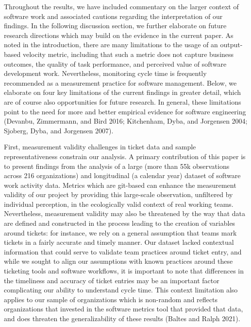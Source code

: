 \documentclass[
]{article}
\begin{document}
Throughout the results, we have included commentary on the larger
context of software work and associated cautions regarding the
interpretation of our findings. In the following discussion section, we
further elaborate on future research directions which may build on the
evidence in the current paper. As noted in the introduction, there are
many limitations to the usage of an output-based velocity metric,
including that such a metric does not capture business outcomes, the
quality of task performance, and perceived value of software development
work. Nevertheless, monitoring cycle time is frequently recommended as a
measurement practice for software management. Below, we elaborate on
four key limitations of the current findings in greater detail, which
are of course also opportunities for future research. In general, these
limitations point to the need for more and better empirical evidence for
software engineering (Devanbu, Zimmermann, and Bird 2016; Kitchenham,
Dyba, and Jorgensen 2004; Sjoberg, Dyba, and Jorgensen 2007).

First, measurement validity challenges in ticket data and sample
representativeness constrain our analysis. A primary contribution of
this paper is to present findings from the analysis of a large (more
than 55k observations across 216 organizations) and longitudinal (a
calendar year) dataset of software work activity data. Metrics which are
git-based can enhance the measurement validity of our project by
providing this large-scale observation, unfiltered by individual
perception, in the ecologically valid context of real working teams.
Nevertheless, measurement validity may also be threatened by the way
that data are defined and constructed in the process leading to the
creation of variables around tickets: for instance, we rely on a general
assumption that teams mark tickets in a fairly accurate and timely
manner. Our dataset lacked contextual information that could serve to
validate team practices around ticket entry, and while we sought to
align our assumptions with known practices around these ticketing tools
and software workflows, it is important to note that differences in the
timeliness and accuracy of ticket entries may be an important factor
complicating our ability to understand cycle time. This context
limitation also applies to our sample of organizations which is
non-random and reflects organizations that invested in the software
metrics tool that provided that data, and does threaten the
generalizability of these results (Baltes and Ralph 2021).
\end{document}
